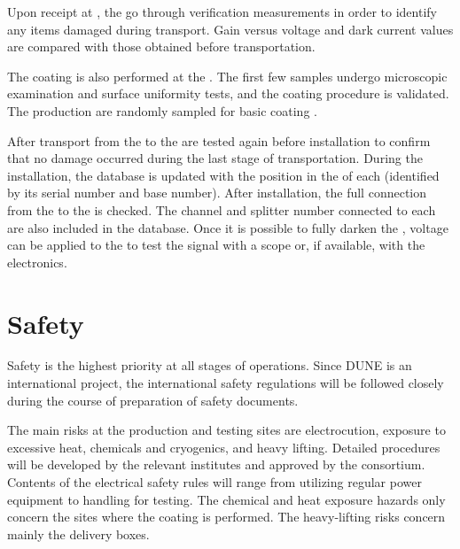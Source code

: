 Upon receipt at , the  go through verification measurements in order to identify any items damaged during transport.  Gain versus voltage and dark current values are compared with those obtained before transportation.

The  coating is also performed at the . The first few samples undergo microscopic examination and surface uniformity tests, and the coating procedure is validated. The production  are randomly sampled for basic coating .

After  transport from the  to \surf the  are tested again before installation to confirm that no damage occurred during the last stage of transportation. During the installation, the  database is updated with the position in the  of each  (identified by its serial number and base number). After installation, the full connection from the  to the  is checked. The  channel and splitter number connected to each  are also included in the  database. %
Once it is possible to fully darken the , voltage can be applied to the  to test the signal with a scope or, if available, with the  electronics.

\section{Safety}
\label{sec:fddp-pd-11}

Safety is the highest priority at all stages of \dual {} operations. Since DUNE is an international project, the international safety regulations will be followed closely during the course of preparation of safety documents.

The main risks at the production and testing sites are electrocution, exposure to excessive heat, chemicals and cryogenics, and heavy lifting. Detailed procedures will be developed by the relevant institutes and approved by the \dual {} consortium. Contents of the electrical safety rules will range from utilizing regular power equipment to handling  for testing. The chemical and heat exposure hazards only concern the sites where the  coating is performed. The heavy-lifting risks concern mainly %
the  delivery boxes.

